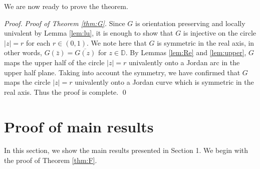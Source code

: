 \documentclass[a4paper,12pt]{amsart}
\numberwithin{equation}{section}
\theoremstyle{definition}
\newenvironment{pf}[1][]{ \vskip 3mm
 \noindent
 \ifthenelse{\equal{#1}{}}  {{\slshape Proof. }}  {{\slshape #1.} } }{\qed\bigskip}
\begin{document}
We are now ready to prove the theorem.

\begin{pf}[Proof of Theorem \ref{thm:G}]
Since $G$ is orientation preserving and locally univalent
by Lemma \ref{lem:lu}, it is enough to show that $G$ is injective
on the circle $|z|=r$ for each $r\in(0,1).$
We note here that $G$ is symmetric in the real axis, in other words,
$G(\bar z)=\overline{G(z)}$ for $z\in{{\mathbb D}}.$
By Lemmas \ref{lem:Re} and \ref{lem:upper}, $G$ maps the upper half of the
circle $|z|=r$ univalently onto a Jordan arc in the upper half plane.
Taking into account the symmetry, we have confirmed that
$G$ maps the circle $|z|=r$ univalently onto a Jordan curve which
is symmetric in the real axis.
Thus the proof is complete.
\end{pf}

\section{Proof of main results}

In this section, we show the main results presented in Section 1.
We begin with the proof of Theorem \ref{thm:F}.
\end{document}
